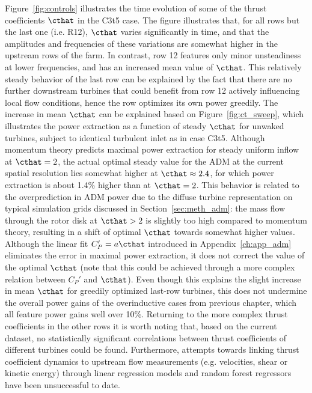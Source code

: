 	Figure~\ref{fig:controls} illustrates the time evolution of some of  the thrust coefficients $\cthat$ in the C3t5 case. The figure illustrates that, for all rows but the last one (i.e. R12), $\cthat$ varies significantly in time, and that the amplitudes and frequencies of these variations are somewhat higher in the upstream rows of the farm. In contrast, row 12 features only minor unsteadiness at lower frequencies, and has an increased mean value of $\cthat$. This relatively steady behavior of the last row can be explained by the fact that there are no further downstream turbines that could benefit from row 12 actively influencing local flow conditions, hence the row optimizes its own power greedily. The increase in mean $\cthat$ can be explained based on Figure~\ref{fig:ct_sweep}, which illustrates the power extraction as a function of steady $\cthat$ for unwaked turbines, subject to identical turbulent inlet as in case C3t5. Although momentum theory predicts maximal power extraction for steady uniform inflow at $\cthat = 2$, the actual optimal steady value for the ADM at the current spatial resolution lies somewhat higher at $\cthat \approx 2.4$, for which power extraction is about 1.4\% higher than at $\cthat = 2$. This behavior is related to the overprediction in ADM power due to the diffuse turbine representation on typical simulation grids discussed in Section~\ref{sec:meth_adm}: the mass flow through the rotor disk at $\cthat > 2$ is slightly too high compared to momentum theory, resulting in a  shift of optimal $\cthat$ towards somewhat higher values. Although the linear fit $C_P' = a \cthat$ introduced in Appendix~\ref{ch:app_adm} eliminates the error in maximal power extraction, it does not correct the value of the optimal $\cthat$ (note that this could be achieved through a more complex relation between $C_P'$ and $\cthat$). Even though this explains the slight increase in mean $\cthat$ for greedily optimized last-row turbines, this does not undermine the overall power gains of the overinductive cases from previous chapter, which all feature power gains well over 10\%. Returning to the more complex thrust coefficients in the other rows it is worth noting that, based on the current dataset, no statistically significant correlations between thrust coefficients of different turbines could be found. Furthermore, attempts towards linking thrust coefficient dynamics to upstream flow measurements (e.g. velocities, shear or kinetic energy) through linear regression models and random forest regressors have been unsuccessful to date. 
	

